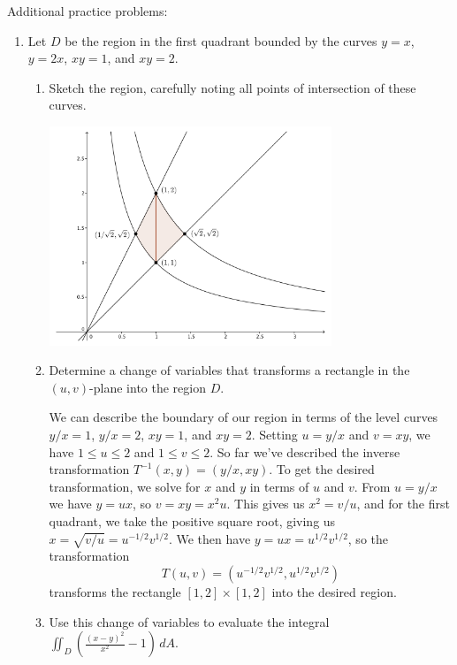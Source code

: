 \documentclass[letterpaper,12pt]{article}
\newcommand{\di}{\displaystyle}
\begin{document}
\pagebreak

Additional practice problems:

\begin{enumerate}
\item Let $D$ be the region in the first quadrant bounded by the curves $y=x$, $y=2x$, $xy=1$, and $xy=2$.
\begin{enumerate}
\item Sketch the region, carefully noting all points of intersection of these curves.

\begin{center}
 \includegraphics[width=0.7\textwidth]{Q15-extra1}
\end{center}

\item Determine a change of variables that transforms a rectangle in the $(u,v)$-plane into the region $D$.

\bigskip

We can describe the boundary of our region in terms of the level curves $y/x=1$, $y/x=2$, $xy=1$, and $xy=2$. Setting $u=y/x$ and $v=xy$, we have $1\leq u\leq 2$ and $1\leq v\leq 2$. So far we've described the inverse transformation $T^{-1}(x,y) = (y/x, xy)$. To get the desired transformation, we solve for $x$ and $y$ in terms of $u$ and $v$. From $u=y/x$ we have $y=ux$, so $v=xy = x^2u$. This gives us $x^2=v/u$, and for the first quadrant, we take the positive square root, giving us $x=\sqrt{v/u} = u^{-1/2}v^{1/2}$. We then have $y=ux = u^{1/2}v^{1/2}$, so the transformation
\[
 T(u,v) = (u^{-1/2}v^{1/2},u^{1/2}v^{1/2})
\]
transforms the rectangle $[1,2]\times [1,2]$ into the desired region.

\item Use this change of variables to evaluate the integral $\di \iint_D\left(\frac{(x-y)^2}{x^2}-1\right)\,dA$.


\end{enumerate}
\end{enumerate}
\end{document}
